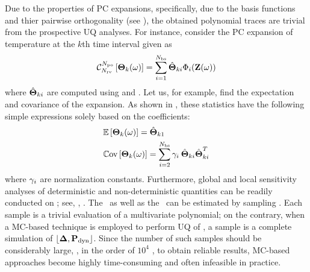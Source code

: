 Due to the properties of PC expansions, specifically, due to the basis functions and thier pairwise orthogonality (see ), the obtained polynomial traces are trivial from the prospective UQ analyses. For instance, consider the PC expansion of temperature at the $k$th time interval given as
\begin{equation} \elabel{pc-k}
  \oPC{\vars}{\pcorder}{\vTO_k(\o)} = \sum_{i = 1}^{\pcterms} \pcc{\vTO}_{ki} \pcb_i(\vZ(\o))
\end{equation}
where $\hat{{\boldsymbol\Theta}}_{ki}$ are computed using  and . Let us, for example, find the expectation and covariance of the expansion. As shown in , these statistics have the following simple expressions solely based on the coefficients:
\begin{align*}
  & \mathbb{E}\left[{\boldsymbol\Theta}_k(\omega)\right] = \hat{{\boldsymbol\Theta}}_{k1} \\
  & \mathbb{C}\text{ov}\left[{\boldsymbol\Theta}_k(\omega)\right] = \sum_{i = 2}^{{N_\text{bs}}} \gamma_i \: \hat{{\boldsymbol\Theta}}_{ki} \hat{{\boldsymbol\Theta}}_{ki}^T
\end{align*}
where $\gamma_i$ are normalization constants. Furthermore, global and local sensitivity analyses of deterministic and non-deterministic quantities can be readily conducted on ; see, \eg, \cite{eldred2009, maitre2010}. The \cdf\ as well as the \pdf\ can be estimated by sampling . Each sample is a trivial evaluation of a multivariate polynomial; on the contrary, when a MC-based technique is employed to perform UQ of , a sample is a complete simulation of $\profPdyn$. Since the number of such samples should be considerably large, \eg, in the order of $10^4$ \cite{xiu2010}, to obtain reliable results, MC-based approaches become highly time-consuming and often infeasible in practice.
